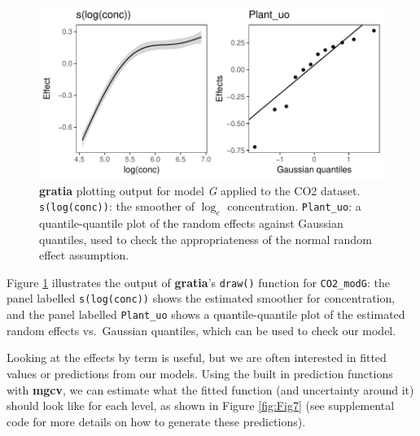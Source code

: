 \documentclass[12pt]{article}
\begin{document}
\begin{figure}
\centering
\includegraphics{../figures/Fig6.pdf}
\caption{\label{fig:Fig6}\textbf{gratia} plotting output for model
\emph{G} applied to the CO2 dataset. \texttt{s(log(conc))}: the smoother
of \(\log_e\) concentration. \texttt{Plant\_uo}: a quantile-quantile
plot of the random effects against Gaussian quantiles, used to check the
appropriateness of the normal random effect assumption.}
\end{figure}

Figure \ref{fig:Fig6} illustrates the output of \textbf{gratia}'s
\texttt{draw()} function for \texttt{CO2\_modG}: the panel labelled
\texttt{s(log(conc))} shows the estimated smoother for concentration,
and the panel labelled \texttt{Plant\_uo} shows a quantile-quantile plot
of the estimated random effects vs.~Gaussian quantiles, which can be
used to check our model.

Looking at the effects by term is useful, but we are often interested in
fitted values or predictions from our models. Using the built in
prediction functions with \textbf{mgcv}, we can estimate what the fitted
function (and uncertainty around it) should look like for each level, as
shown in Figure \ref{fig:Fig7} (see supplemental code for more details
on how to generate these predictions).
\end{document}
